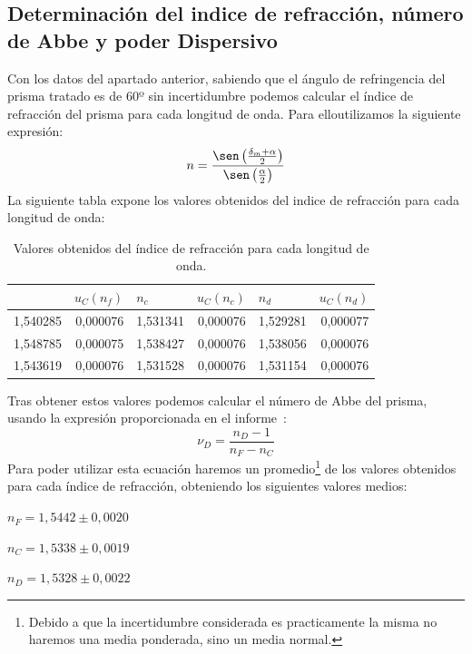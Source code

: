 \documentclass[10pt,onecolumn]{article}
\begin{document}
\subsection{Determinación del indice de refracción, número de Abbe y poder Dispersivo}

Con los datos del apartado anterior,  sabiendo que el ángulo de refringencia del prisma tratado es de 60º sin incertidumbre podemos calcular el índice de refracción del prisma para cada longitud de onda. Para elloutilizamos la siguiente expresión: 
\[
n = \frac{\sen\left( \frac{\delta_m + \alpha}{2} \right)}{\sen\left( \frac{\alpha}{2} \right)}
\]
La siguiente tabla expone los valores obtenidos del indice de refracción para cada longitud de onda:

\begin{table}[H]
\centering
\begin{tabular}{|r|r|r|r|r|r|}
\hline
\rowcolor[rgb]{ .651,  .788,  .925}
\multicolumn{1}{|l|}{$n_f$} & \multicolumn{1}{l|}{$u_C(n_f)$} & \multicolumn{1}{l|}{$n_c$} & \multicolumn{1}{l|}{$u_C(n_c)$} & \multicolumn{1}{l|}{$n_d$} & \multicolumn{1}{l|}{$u_C(n_d)$} \\ \hline
\rowcolor[rgb]{.816,  .816,  .816}1,540285 & 0,000076 & 1,531341 & 0,000076 & 1,529281 & 0,000077 \\ \hline
\rowcolor[rgb]{.816,  .816,  .816}1,548785 & 0,000075 & 1,538427 & 0,000076 & 1,538056 & 0,000076 \\ \hline
\rowcolor[rgb]{.816,  .816,  .816}1,543619 & 0,000076 & 1,531528 & 0,000076 & 1,531154 & 0,000076 \\ \hline
\end{tabular}
\caption{Valores obtenidos del índice de refracción para cada longitud de onda.}\label{tab:indice_refraccion}
\end{table}

Tras obtener estos valores podemos calcular el número de Abbe del prisma, usando la expresión proporcionada en el informe~\cite{InfoOpticaPrisma}:
 \[
\nu_D = \frac{n_D - 1}{n_F - n_C}
\]
Para poder utilizar esta ecuación haremos un promedio\footnote{Debido a que la incertidumbre considerada es practicamente la misma no haremos una media ponderada, sino un media normal.} de los valores obtenidos para cada 
índice de refracción, obteniendo los siguientes valores medios:

$n_F = 1,5442\pm 0,0020$	

$n_C = 1,5338\pm 0,0019$	

$n_D = 1,5328\pm 0,0022$
\end{document}
